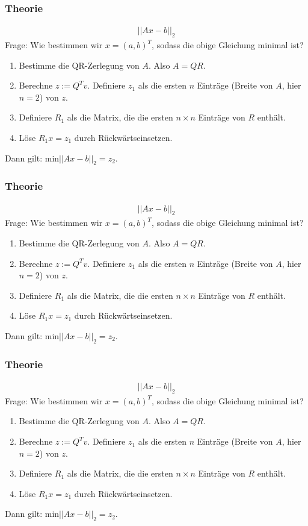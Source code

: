 \documentclass{beamer}
\begin{document}
\begin{frame}
    \frametitle{Theorie}
    \begin{align*}
        ||Ax - b||_2
    \end{align*}
    Frage: Wie bestimmen wir \(x = (a, b)^T\), sodass die obige Gleichung minimal ist?
    \begin{enumerate}
        \item Bestimme die QR-Zerlegung von \(A\). Also \(A = QR\).
        \item Berechne \(z := Q^T v\). Definiere \(z_1\) als die ersten \(n\) Einträge (Breite von \(A\), hier \(n = 2\)) von \(z\).
        \item Definiere \(R_1\) als die Matrix, die die ersten \(n \times n\) Einträge von \(R\) enthält.
        \item {\color{white}Löse \(R_1 x = z_1\) durch Rückwärtseinsetzen.}
    \end{enumerate}
    {\color{white}Dann gilt: \(\text{min}||Ax - b||_2 = z_2\).}
\end{frame}

\begin{frame}
    \frametitle{Theorie}
    \begin{align*}
        ||Ax - b||_2
    \end{align*}
    Frage: Wie bestimmen wir \(x = (a, b)^T\), sodass die obige Gleichung minimal ist?
    \begin{enumerate}
        \item Bestimme die QR-Zerlegung von \(A\). Also \(A = QR\).
        \item Berechne \(z := Q^T v\). Definiere \(z_1\) als die ersten \(n\) Einträge (Breite von \(A\), hier \(n = 2\)) von \(z\).
        \item Definiere \(R_1\) als die Matrix, die die ersten \(n \times n\) Einträge von \(R\) enthält.
        \item Löse \(R_1 x = z_1\) durch Rückwärtseinsetzen.
    \end{enumerate}
    {\color{white}Dann gilt: \(\text{min}||Ax - b||_2 = z_2\).}
\end{frame}

\begin{frame}
    \frametitle{Theorie}
    \begin{align*}
        ||Ax - b||_2
    \end{align*}
    Frage: Wie bestimmen wir \(x = (a, b)^T\), sodass die obige Gleichung minimal ist?
    \begin{enumerate}
        \item Bestimme die QR-Zerlegung von \(A\). Also \(A = QR\).
        \item Berechne \(z := Q^T v\). Definiere \(z_1\) als die ersten \(n\) Einträge (Breite von \(A\), hier \(n = 2\)) von \(z\).
        \item Definiere \(R_1\) als die Matrix, die die ersten \(n \times n\) Einträge von \(R\) enthält.
        \item Löse \(R_1 x = z_1\) durch Rückwärtseinsetzen.
    \end{enumerate}
    Dann gilt: \(\text{min}||Ax - b||_2 = z_2\).
\end{frame}
\end{document}
